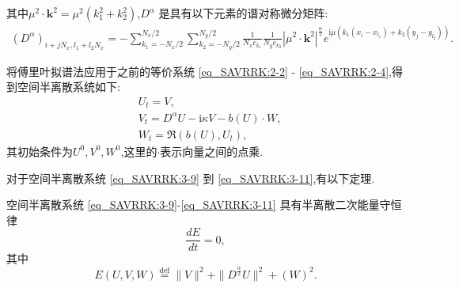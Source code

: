 其中$\mu^{2} \cdot \mathbf{k}^{2}=\mu^{2}\left(k_{1}^{2}+k_{2}^{2}\right)$,$D^{\alpha}$ 是具有以下元素的谱对称微分矩阵:
\begin{align}\label{eq_SAVRRK:54}
\left(D^{\alpha}\right)_{i+j N_{x}, l_{1}+l_{2} N_{x}}=-\sum\limits_{k_{1}=-N_{x} / 2}^{N_{x} / 2} \sum\limits_{k_{2}=-N_{y} / 2}^{N_{y} / 2}\frac{1}{N_{x} c_{k_{1}}} \frac{1}{N_{y} c_{k_{2}}}\left|\mu^{2} \cdot \mathbf{k}^{2}\right|^{\frac{\alpha}{2}} e^{\mathrm{i}\mu\left(k_{1}\left(x_{i}-x_{l_{1}}\right)+k_{2}\left(y_{j}-y_{l_{2}}\right)\right)}.
\end{align}

将傅里叶拟谱法应用于之前的等价系统 \eqref{eq_SAVRRK:2-2} - \eqref{eq_SAVRRK:2-4},得到空间半离散系统如下:
\begin{align}
& U_t=V, \label{eq_SAVRRK:3-9}\\
& V_t=D^{\alpha} U-\mathrm{i}\kappa V- b(U) \cdot W, \label{eq_SAVRRK:3-10}\\
& W_t=\Re\left(b(U), U_t\right),\label{eq_SAVRRK:3-11}
\end{align}
其初始条件为$U^0, V^0, W^0$,这里的$\cdot$表示向量之间的点乘.

对于空间半离散系统 \eqref{eq_SAVRRK:3-9} 到 \eqref{eq_SAVRRK:3-11},有以下定理.

\begin{theorem}	\label{thm3}
空间半离散系统 \eqref{eq_SAVRRK:3-9}-\eqref{eq_SAVRRK:3-11} 具有半离散二次能量守恒律
\begin{equation}
\frac{dE}{dt}=0, \label{eq_SAVRRK:313a}
\end{equation}
其中
\begin{equation}
E(U,V,W)\overset{\text{def}}{=}\|V\|^2 + \|D^\frac{\alpha}{2} U\|^2+\left(W\right)^2.\label{eq_SAVRRK:313}
\end{equation}
\end{theorem}

